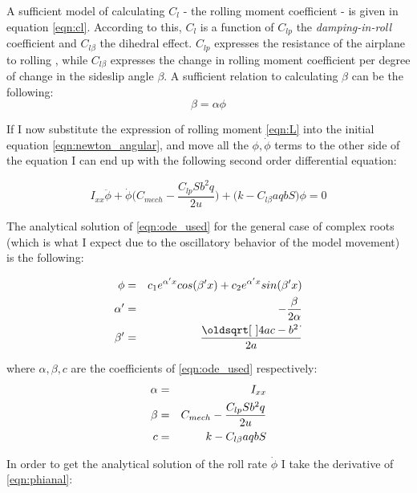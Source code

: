 A sufficient model of calculating $C_l$ - the rolling moment coefficient - is given in equation
\ref{eqn:cl}. According to this, $C_l$ is a function of $C_{lp}$ the \textit{damping-in-roll}
coefficient and $C_{l\beta}$ the dihedral effect.
$C_{lp}$ expresses the resistance of the airplane to rolling 
\cite{etkin_dynamics_1972}, while $C_{l\beta}$ expresses the change in rolling moment 
coefficient per degree of change in the sideslip angle $\beta$. A sufficient relation to 
calculating $\beta$ can be the following:
\begin{equation}
    \beta = \alpha \phi
    \label{eqn:beta}
\end{equation}

If I now substitute the expression of rolling moment \ref{eqn:L} into the initial equation
\ref{eqn:newton_angular}, and move all the $\phi, \dot{\phi}$ terms to the other side of the equation
I can end up with the following second order differential equation:

\begin{equation}
    I_{xx}\ddot{\phi} + \dot{\phi}\big(C_{mech} - \frac{C_{lp}Sb^2q}{2u}\big) + \big(k - C_{l\beta}aqbS\big)\phi = 0
    \label{eqn:ode_used}
\end{equation}

The analytical solution of \ref{eqn:ode_used} for the general case of complex roots
(which is what I expect due to the oscillatory behavior of the model movement) is the following:

\begin{eqnarray}
    \phi &=&  c_1e^{\alpha' x}cos(\beta' x) + c_2e^{\alpha' x} sin(\beta' x) \label{eqn:phianal}\\
    \alpha' &=&  -\frac{\beta}{2\alpha} \notag\\
    \beta' &=&  \frac{\sqrt{4ac - b^2}}{2a} \notag\\
\end{eqnarray}

where $\alpha, \beta, c$ are the coefficients of \ref{eqn:ode_used} respectively:
\begin{eqnarray}
    \alpha &=& I_{xx} \notag\\
    \beta &=&  C_{mech} - \frac{C_{lp}Sb^2q}{2u} \notag\\
    c &=&  k - C_{l\beta}aqbS \notag
\end{eqnarray}

\noindent In order to get the analytical solution of the roll rate $\dot{\phi}$ I take the derivative 
of \ref{eqn:phianal}:

